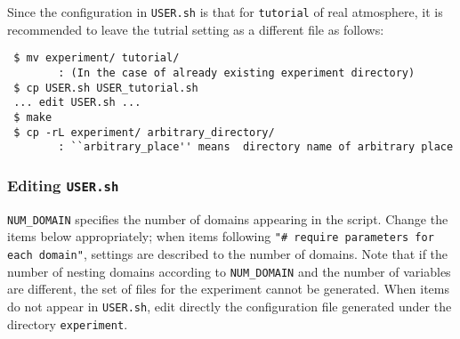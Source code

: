 Since the configuration in \verb|USER.sh| is that for \verb|tutorial| of real atmosphere,
it is recommended to leave the tutrial setting as a different file as follows: 
\begin{verbatim}
 $ mv experiment/ tutorial/    
        : (In the case of already existing experiment directory)
 $ cp USER.sh USER_tutorial.sh
 ... edit USER.sh ...
 $ make
 $ cp -rL experiment/ arbitrary_directory/
        : ``arbitrary_place'' means  directory name of arbitrary place
\end{verbatim}


\subsubsection{Editing \texttt{USER.sh}}

\verb|NUM_DOMAIN| specifies the number of domains appearing in the script.
Change the items below appropriately;
when items following \verb|"# require parameters for each domain"|, settings are described to the number of domains. Note that if the number of nesting domains according to \verb|NUM_DOMAIN| and the number of variables are different, the set of files for the experiment cannot be generated. When items do not appear in \verb|USER.sh|, edit directly the configuration file generated under the directory \verb|experiment|.
